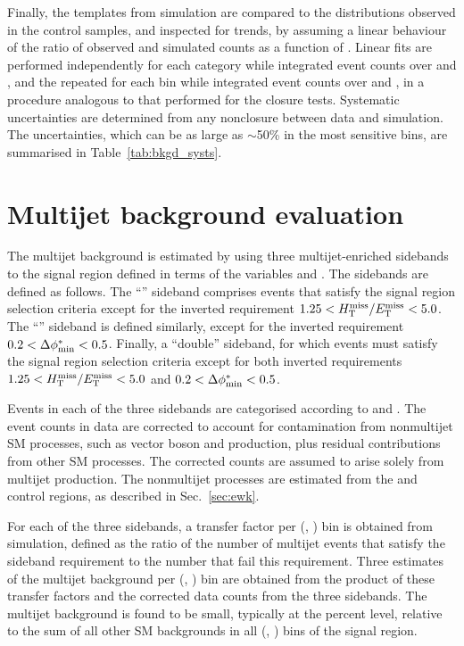 Finally, the \mht templates from simulation are compared to the
distributions observed in the control samples, and inspected for
trends, by assuming a linear behaviour of the ratio of observed and
simulated counts as a function of \mht. Linear fits are performed
independently for each \njet category while integrated event counts
over \nb and \scalht, and the repeated for each \scalht bin while
integrated event counts over \njet and \nb, in a procedure analogous
to that performed for the closure tests. Systematic uncertainties are
determined from any nonclosure between data and simulation. The
uncertainties, which can be as large as $\sim$50\% in the most
sensitive \mht bins, are summarised in Table~\ref{tab:bkgd_systs}.


\section{Multijet background evaluation}
\label{sec:qcd}

The multijet background is estimated by using three multijet-enriched
sidebands to the signal region defined in terms of the variables
\mhtmet and \bdphi. The sidebands are defined as follows. The
``\mhtmet'' sideband comprises events that satisfy the signal region
selection criteria except for the inverted requirement $1.25 < H_{\mathrm{T}}^{\text{miss}} / E_{\mathrm{T}}^{\text{miss}}
< 5.0$. The ``\bdphi'' sideband is defined similarly, except for the
inverted requirement $0.2 < \Delta\phi^{*}_\text{min} < 0.5$. Finally, a ``double''
sideband, for which events must satisfy the signal region selection
criteria except for both inverted requirements $1.25 < H_{\mathrm{T}}^{\text{miss}} / E_{\mathrm{T}}^{\text{miss}} < 5.0$
and $0.2 < \Delta\phi^{*}_\text{min} < 0.5$.

Events in each of the three sidebands are categorised according to
\njet and \scalht. The event counts in data are corrected to account
for contamination from nonmultijet SM processes, such as vector boson
and \ttbar production, plus residual contributions from other SM
processes. The corrected counts are assumed to arise solely from
multijet production. The nonmultijet processes are estimated from the
\mj and \mmj control regions, as described in Sec.~\ref{sec:ewk}.

For each of the three sidebands, a transfer factor per (\njet,
\scalht) bin is obtained from simulation, defined as the ratio of the
number of multijet events that satisfy the sideband requirement to the
number that fail this requirement. Three estimates of the multijet
background per (\njet, \scalht) bin are obtained from the product of
these transfer factors and the corrected data counts from the three
sidebands. The multijet background is found to be small, typically at
the percent level, relative to the sum of all other SM backgrounds in
all (\njet, \nb) bins of the signal region.

